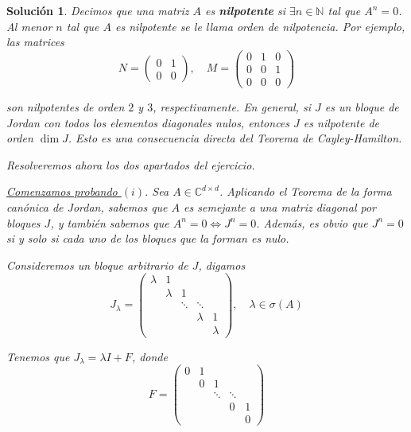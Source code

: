 \documentclass[11pt, a4paper]{article}
\newif\IfInSansMode
\numberwithin{equation}{section}
\theoremstyle{theorem-style}
\theoremstyle{definition-style}
\theoremstyle{remark-style}
\newtheorem*{sol}{Solución}
\theoremstyle{example-style}
\begin{document}
    \begin{sol}
        Decimos que una matriz $A$ es \textbf{nilpotente} si $\exists n \in \mathbb{N}$ tal
        que $A^n = 0$. Al menor $n$ tal que $A$ es nilpotente se le llama \textit{orden de nilpotencia}. Por ejemplo, las matrices
        $$ N = \begin{pmatrix}
            0 & 1 \\
            0 & 0
        \end{pmatrix}, \quad M = 
        \begin{pmatrix}
            0 & 1 & 0 \\
            0 & 0 & 1\\
            0 & 0 & 0
        \end{pmatrix}$$

        son nilpotentes de orden $2$ y $3$, respectivamente. En general, si $J$ es un bloque de Jordan con todos los elementos diagonales nulos, entonces $J$ es nilpotente de orden $\dim J$. Esto es una consecuencia directa del \textit{Teorema de Cayley-Hamilton}.

        Resolveremos ahora los dos apartados del ejercicio.

        \underline{Comenzamos probando $(i)$}. Sea $A \in \mathbb{C}^{d\times d}$. Aplicando el \textit{Teorema de la forma canónica de Jordan}, sabemos que $A$ es semejante a una matriz diagonal por bloques $J$, y también sabemos que $A^n = 0 \iff J^n = 0$. Además, es obvio que $J^n = 0$ si y solo si cada uno de los bloques que la forman es nulo.



        Consideremos un bloque arbitrario de $J$, digamos $$J_\lambda = \begin{pmatrix}
            \lambda & 1\\
                    & \lambda & 1 \\
                    & & \ddots & \ddots \\
                    & & & \lambda & 1 \\
                    & & & & \lambda
        \end{pmatrix}, \quad \lambda \in \sigma(A)$$


        Tenemos que $J_\lambda = \lambda I + F$, donde $$F = \begin{pmatrix}
            0 & 1\\
              & 0 & 1 \\
              & & \ddots & \ddots \\
              & & & 0 & 1 \\
              & & & & 0
        \end{pmatrix}$$


\end{sol}
\end{document}
